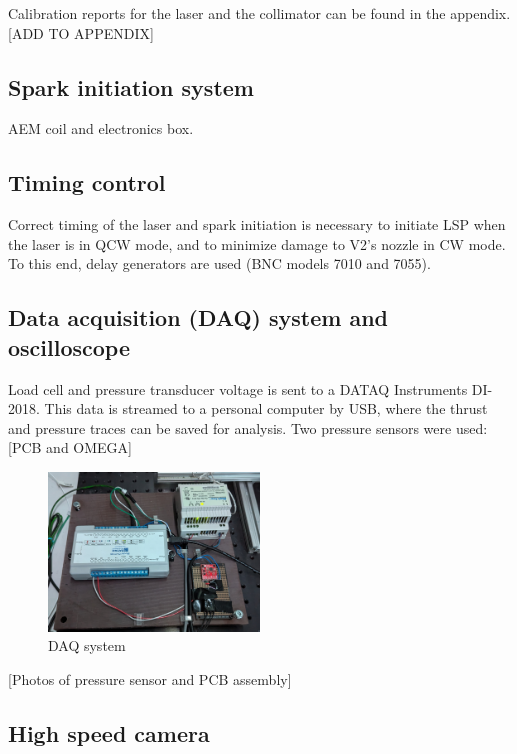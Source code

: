             Calibration reports for the laser and the collimator can be found in the appendix. [ADD TO APPENDIX]

        \subsection{Spark initiation system}

            AEM coil and electronics box.

        \subsection{Timing control}

            Correct timing of the laser and spark initiation is necessary to initiate LSP when the laser is in QCW mode, and to minimize damage to V2's nozzle in CW mode. To this end, delay generators are used (BNC models 7010 and 7055).

        \subsection{Data acquisition (DAQ) system and oscilloscope}

            Load cell and pressure transducer voltage is sent to a DATAQ Instruments DI-2018. This data is streamed to a personal computer by USB, where the thrust and pressure traces can be saved for analysis. Two pressure sensors were used: [PCB and OMEGA]

            \begin{figure}[!ht]
                \centering
                \includegraphics[width=0.50\textwidth]{assets/3 design/DAQ electronics.jpg}
                \caption{DAQ system}
                \label{fig:DAQ}
            \end{figure}

            [Photos of pressure sensor and PCB assembly]

        \subsection{High speed camera}

